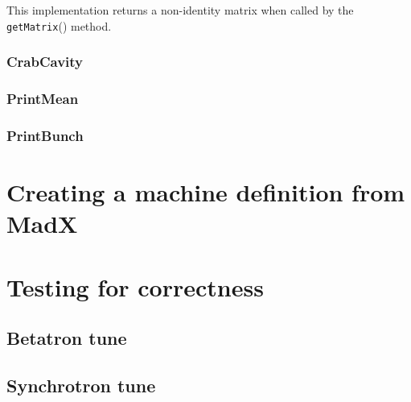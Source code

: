 \documentclass[a4paper]{report}
\begin{document}
This implementation returns a non-identity matrix when called by the \texttt{getMatrix}() method.




\subsection{CrabCavity}
\subsection{PrintMean}
\subsection{PrintBunch}

\appendix
\chapter{Creating a machine definition from MadX}
\label{sec:MadX}

\chapter{Testing for correctness}
\section{Betatron tune}

\section{Synchrotron tune}
\end{document}

